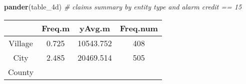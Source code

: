 \documentclass[]{book}
\newenvironment{Shaded}{\begin{snugshade}}{\end{snugshade}}
\newcommand{\KeywordTok}[1]{\textcolor[rgb]{0.13,0.29,0.53}{\textbf{#1}}}
\newcommand{\CommentTok}[1]{\textcolor[rgb]{0.56,0.35,0.01}{\textit{#1}}}
\newcommand{\NormalTok}[1]{#1}
\theoremstyle{definition}
\theoremstyle{definition}
\theoremstyle{definition}
\theoremstyle{remark}
\begin{document}
\begin{Shaded}
\begin{Highlighting}[]
\KeywordTok{pander}\NormalTok{(table_4d)  }\CommentTok{# claims summary by entity type and alarm credit == 15}
\end{Highlighting}
\end{Shaded}

\begin{longtable}[]{@{}cccc@{}}
\toprule
\begin{minipage}[b]{0.12\columnwidth}\centering\strut
~\strut
\end{minipage} & \begin{minipage}[b]{0.11\columnwidth}\centering\strut
Freq.m\strut
\end{minipage} & \begin{minipage}[b]{0.15\columnwidth}\centering\strut
yAvg.m\strut
\end{minipage} & \begin{minipage}[b]{0.15\columnwidth}\centering\strut
Freq.num\strut
\end{minipage}\tabularnewline
\midrule
\endhead
\begin{minipage}[t]{0.12\columnwidth}\centering\strut
Village\strut
\end{minipage} & \begin{minipage}[t]{0.11\columnwidth}\centering\strut
0.725\strut
\end{minipage} & \begin{minipage}[t]{0.15\columnwidth}\centering\strut
10543.752\strut
\end{minipage} & \begin{minipage}[t]{0.15\columnwidth}\centering\strut
408\strut
\end{minipage}\tabularnewline
\begin{minipage}[t]{0.12\columnwidth}\centering\strut
City\strut
\end{minipage} & \begin{minipage}[t]{0.11\columnwidth}\centering\strut
2.485\strut
\end{minipage} & \begin{minipage}[t]{0.15\columnwidth}\centering\strut
20469.514\strut
\end{minipage} & \begin{minipage}[t]{0.15\columnwidth}\centering\strut
505\strut
\end{minipage}\tabularnewline
\begin{minipage}[t]{0.12\columnwidth}\centering\strut
County\strut
\end{minipage} & \begin{minipage}[t]{0.11\columnwidth}\centering\strut

\end{minipage}
\end{longtable}
\end{document}
